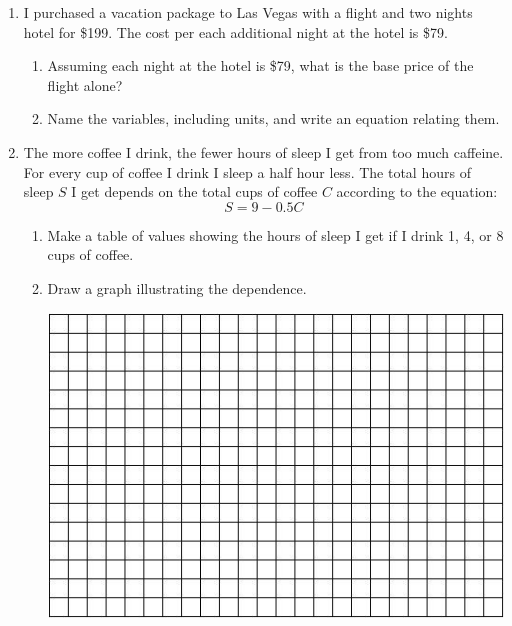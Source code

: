 \documentclass[12pt]{article}
\begin{document}
\begin{enumerate}

\item I purchased a vacation package to Las Vegas with a flight and two nights hotel for \$199.  The cost per each additional night at the hotel is \$79.  

\begin{enumerate}
\item Assuming each night at the hotel is \$79, what is the base price of the flight alone?
\vfill

\item Name the variables, including units, and write an equation relating them.
\vfill
\vfill
\end{enumerate}
\newpage %


\item The more coffee I drink, the fewer hours of sleep I get from too much caffeine.  For every cup of coffee I drink I sleep a half hour less.  The total hours of sleep $S$ I get depends on the total cups of coffee $C$ according to the equation: $$S=9-0.5C$$

\begin{enumerate}
\item Make a table of values showing the hours of sleep I get if I drink 1, 4, or 8 cups of coffee. 
\vfill
\vfill
\item Draw a graph illustrating the dependence.  

\vspace{.1in}
\begin{center}
 {\includegraphics [width = 6in] {../GraphPaper}}
\end{center}
\vspace{.1in}


\end{enumerate}
\end{enumerate}
\end{document}
